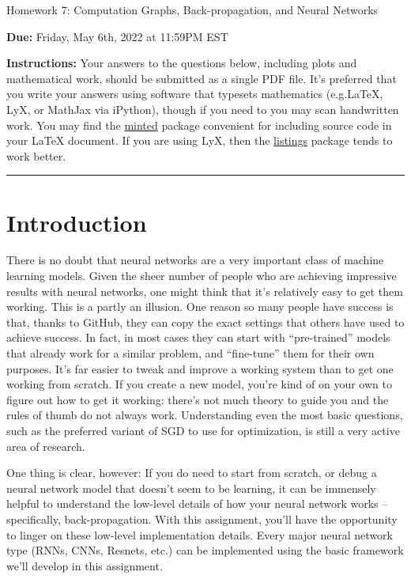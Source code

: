 \documentclass{article}
\newcommand{\ruleskip}{\bigskip\hrule\bigskip}
\theoremstyle{plain}
\theoremstyle{definition}
\begin{document}

\pagestyle{myheadings} 

\begin{center}
{\Large
Homework 7: Computation Graphs, Back-propagation, and Neural Networks
} 
\end{center}

{
{ \color{nyupurple} \textbf{Due:} Friday, May 6th, 2022 at 11:59PM EST} 
} 

\textbf{Instructions: }Your answers to the questions below, including plots and mathematical work, should be submitted as a single PDF file.  It's preferred that you write your answers using software that typesets mathematics (e.g.LaTeX, LyX, or MathJax via iPython), though if you need to you may scan handwritten work.  You may find the \href{https://github.com/gpoore/minted}{minted} package convenient for including source code in your LaTeX document.  If you are using LyX, then the \href{https://en.wikibooks.org/wiki/LaTeX/Source_Code_Listings}{listings} package tends to work better. 

\ruleskip

\section{Introduction}

There is no doubt that neural networks are a very important class
of machine learning models. Given the sheer number of people who are
achieving impressive results with neural networks, one might think
that it's relatively easy to get them working. This is a partly an
illusion. One reason so many people have success is that, thanks to
GitHub, they can copy the exact settings that others have used to
achieve success. In fact, in most cases they can start with ``pre-trained''
models that already work for a similar problem, and ``fine-tune''
them for their own purposes. It's far easier to tweak and improve
a working system than to get one working from scratch. If you create
a new model, you're kind of on your own to figure out how to get it
working: there's not much theory to guide you and the rules of thumb
do not always work. Understanding even the most basic questions, such
as the preferred variant of SGD to use for optimization, is still
a very active area of research.

One thing is clear, however: If you do need to start from scratch,
or debug a neural network model that doesn't seem to be learning,
it can be immensely helpful to understand the low-level details of
how your neural network works -- specifically, back-propagation.
With this assignment, you'll have the opportunity to linger on these
low-level implementation details. Every major neural network type
(RNNs, CNNs, Resnets, etc.) can be implemented using the basic framework
we'll develop in this assignment.
\end{document}
